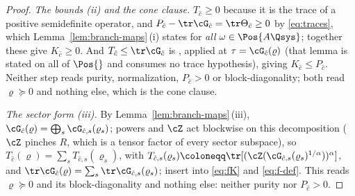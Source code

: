 \begin{proof}
\emph{The bounds (ii) and the cone clause.} $T_{\hat c}\ge0$
because it is the trace of a positive semidefinite operator, and
$P_{\hat c}-\tr\cG_{\hat c}=\tr\Theta_{\hat c}\ge0$ by \eqref{eq:traces},
which Lemma~\ref{lem:branch-maps}\,(i) states for \emph{all}
$\omega\in\Pos{A\Qsys}$; together these give $K_{\hat c}\ge0$. And
$T_{\hat c}\le\tr\cG_{\hat c}$ is
, applied at
$\tau=\cG_{\hat c}(\varrho)$ (that lemma is stated on all of $\Pos{}$
and consumes no trace hypothesis), giving $K_{\hat c}\le P_{\hat c}$.
Neither step reads purity, normalization, $P_{\hat c}>0$ or
block-diagonality; both read $\varrho\succeq0$ and nothing else, which is
the cone clause.

\emph{The sector form (iii).} By Lemma~\ref{lem:branch-maps}\,(iii),
$\cG_{\hat c}(\varrho)=\bigoplus_s\cG_{\hat c,s}(\varrho_s)$; powers and
$\cZ$ act blockwise on this decomposition ($\cZ$ pinches $R$, which is a
tensor factor of every sector subspace), so
$T_{\hat c}(\varrho)=\sum_sT_{\hat c,s}(\varrho_s)$, with
$T_{\hat c,s}(\varrho_s)\coloneqq
\tr[(\cZ(\cG_{\hat c,s}(\varrho_s)^{1/\alpha}))^{\alpha}]$, and
$\tr\cG_{\hat c}(\varrho)=\sum_s\tr\cG_{\hat c,s}(\varrho_s)$; insert into
\eqref{eq:fK} and \eqref{eq:f-def}. This reads $\varrho\succeq0$ and its
block-diagonality and nothing else: neither purity nor $P_{\hat c}>0$.
\end{proof}
